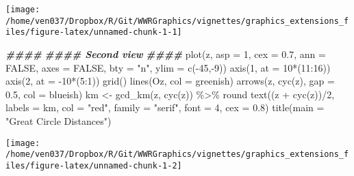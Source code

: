 \documentclass[
]{article}
\newenvironment{Shaded}{\begin{snugshade}}{\end{snugshade}}
\newcommand{\AttributeTok}[1]{\textcolor[rgb]{0.77,0.63,0.00}{#1}}
\newcommand{\ConstantTok}[1]{\textcolor[rgb]{0.00,0.00,0.00}{#1}}
\newcommand{\DecValTok}[1]{\textcolor[rgb]{0.00,0.00,0.81}{#1}}
\newcommand{\DocumentationTok}[1]{\textcolor[rgb]{0.56,0.35,0.01}{\textbf{\textit{#1}}}}
\newcommand{\FloatTok}[1]{\textcolor[rgb]{0.00,0.00,0.81}{#1}}
\newcommand{\FunctionTok}[1]{\textcolor[rgb]{0.00,0.00,0.00}{#1}}
\newcommand{\NormalTok}[1]{#1}
\newcommand{\OtherTok}[1]{\textcolor[rgb]{0.56,0.35,0.01}{#1}}
\newcommand{\SpecialCharTok}[1]{\textcolor[rgb]{0.00,0.00,0.00}{#1}}
\newcommand{\StringTok}[1]{\textcolor[rgb]{0.31,0.60,0.02}{#1}}
\begin{document}
\texttt{[image: /home/ven037/Dropbox/R/Git/WWRGraphics/vignettes/graphics\_extensions\_files/figure-latex/unnamed-chunk-1-1]}

\begin{Shaded}
\begin{Highlighting}[]
\DocumentationTok{\#\#\#\# }
\DocumentationTok{\#\#\#\# Second view}
\DocumentationTok{\#\#\#\# }
\FunctionTok{plot}\NormalTok{(z, }\AttributeTok{asp =} \DecValTok{1}\NormalTok{, }\AttributeTok{cex =} \FloatTok{0.7}\NormalTok{, }\AttributeTok{ann =} \ConstantTok{FALSE}\NormalTok{, }\AttributeTok{axes =} \ConstantTok{FALSE}\NormalTok{, }\AttributeTok{bty =} \StringTok{"n"}\NormalTok{, }
     \AttributeTok{ylim =} \FunctionTok{c}\NormalTok{(}\SpecialCharTok{{-}}\DecValTok{45}\NormalTok{,}\SpecialCharTok{{-}}\DecValTok{9}\NormalTok{))}
\FunctionTok{axis}\NormalTok{(}\DecValTok{1}\NormalTok{, }\AttributeTok{at =} \DecValTok{10}\SpecialCharTok{*}\NormalTok{(}\DecValTok{11}\SpecialCharTok{:}\DecValTok{16}\NormalTok{))}
\FunctionTok{axis}\NormalTok{(}\DecValTok{2}\NormalTok{, }\AttributeTok{at =} \SpecialCharTok{{-}}\DecValTok{10}\SpecialCharTok{*}\NormalTok{(}\DecValTok{5}\SpecialCharTok{:}\DecValTok{1}\NormalTok{))}
\FunctionTok{grid}\NormalTok{()}
\FunctionTok{lines}\NormalTok{(Oz, }\AttributeTok{col =}\NormalTok{ greenish)}
\FunctionTok{arrows}\NormalTok{(z, }\FunctionTok{cyc}\NormalTok{(z), }\AttributeTok{gap =} \FloatTok{0.5}\NormalTok{, }\AttributeTok{col =}\NormalTok{ blueish)}
\NormalTok{km }\OtherTok{\textless{}{-}} \FunctionTok{gcd\_km}\NormalTok{(z, }\FunctionTok{cyc}\NormalTok{(z)) }\SpecialCharTok{\%\textgreater{}\%}\NormalTok{ round}
\FunctionTok{text}\NormalTok{((z }\SpecialCharTok{+} \FunctionTok{cyc}\NormalTok{(z))}\SpecialCharTok{/}\DecValTok{2}\NormalTok{, }\AttributeTok{labels =}\NormalTok{ km, }\AttributeTok{col =} \StringTok{"red"}\NormalTok{, }\AttributeTok{family =} \StringTok{"serif"}\NormalTok{, }
     \AttributeTok{font =} \DecValTok{4}\NormalTok{, }\AttributeTok{cex =} \FloatTok{0.8}\NormalTok{)}
\FunctionTok{title}\NormalTok{(}\AttributeTok{main =} \StringTok{"Great Circle Distances"}\NormalTok{)}
\end{Highlighting}
\end{Shaded}

\texttt{[image: /home/ven037/Dropbox/R/Git/WWRGraphics/vignettes/graphics\_extensions\_files/figure-latex/unnamed-chunk-1-2]}
\end{document}
